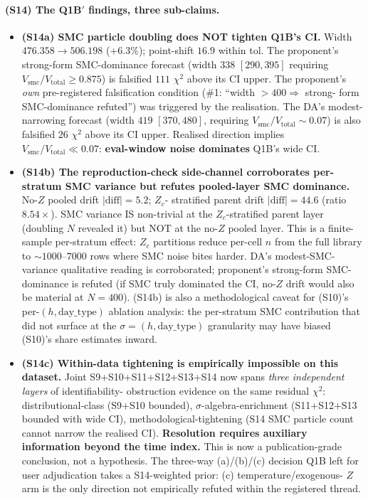 \documentclass[11pt]{article}
\theoremstyle{definition}
\theoremstyle{plain}
\begin{document}
\paragraph{(S14) The Q1B$'$ findings, three sub-claims.}
\begin{itemize}[leftmargin=2em]
\item \textbf{(S14a) SMC particle doubling does NOT tighten Q1B's
CI.} Width $476.358 \to 506.198$ (+$6.3\%$); point-shift
$16.9$ within tol. The proponent's strong-form SMC-dominance
forecast (width $338$ $[290, 395]$ requiring $V_{\mathrm{smc}}/
V_{\mathrm{total}} \ge 0.875$) is falsified $111$ $\chi^2$ above
its CI upper. The proponent's \emph{own} pre-registered
falsification condition (\#1: ``width $> 400 \Rightarrow$ strong-
form SMC-dominance refuted'') was triggered by the realisation.
The DA's modest-narrowing forecast (width $419$ $[370, 480]$,
requiring $V_{\mathrm{smc}}/V_{\mathrm{total}} \sim 0.07$) is
also falsified $26$ $\chi^2$ above its CI upper. Realised direction
implies $V_{\mathrm{smc}}/V_{\mathrm{total}} \ll 0.07$:
\textbf{eval-window noise dominates} Q1B's wide CI.

\item \textbf{(S14b) The reproduction-check side-channel
corroborates per-stratum SMC variance but refutes pooled-layer
SMC dominance.} No-$Z$ pooled drift $|\mathrm{diff}| = 5.2$; $Z_c$-
stratified parent drift $|\mathrm{diff}| = 44.6$ (ratio $8.54\times$).
SMC variance IS non-trivial at the $Z_c$-stratified parent layer
(doubling $N$ revealed it) but NOT at the no-$Z$ pooled layer.
This is a finite-sample per-stratum effect: $Z_c$ partitions
reduce per-cell $n$ from the full library to $\sim 1000$--$7000$
rows where SMC noise bites harder. DA's modest-SMC-variance
qualitative reading is corroborated; proponent's strong-form
SMC-dominance is refuted (if SMC truly dominated the CI, no-$Z$
drift would also be material at $N = 400$). (S14b) is also a
methodological caveat for (S10)'s per-$(h, \mathrm{day\_type})$
ablation analysis: the per-stratum SMC contribution that did not
surface at the $\sigma = (h, \mathrm{day\_type})$ granularity may
have biased (S10)'s share estimates inward.

\item \textbf{(S14c) Within-data tightening is empirically
impossible on this dataset.} Joint S9+S10+S11+S12+S13+S14 now
spans \emph{three independent layers} of identifiability-
obstruction evidence on the same residual $\chi^2$:
distributional-class (S9+S10 bounded), $\sigma$-algebra-enrichment
(S11+S12+S13 bounded with wide CI), methodological-tightening
(S14 SMC particle count cannot narrow the realised CI).
\textbf{Resolution requires auxiliary information beyond the
time index.} This is now a publication-grade conclusion, not a
hypothesis. The three-way (a)/(b)/(c) decision Q1B left for user
adjudication takes a S14-weighted prior: (c) temperature/exogenous-
$Z$ arm is the only direction not empirically refuted within the
registered thread.
\end{itemize}
\end{document}
